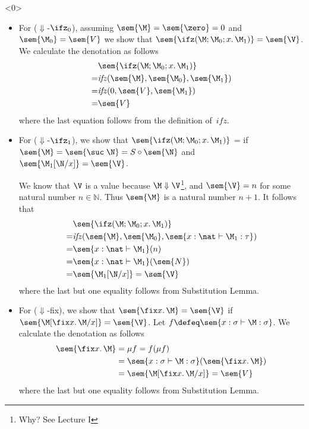 \begin{frame}<0>
\begin{itemize}
  \item For ($\Downarrow$-$\ifz_0$), assuming $\sem{\M}=\sem{\zero} = 0$
    and $\sem{\M_0} = \sem{V}$ we show that
    $\sem{\ifz(\M; \M_0; x.\, \M_1)} = \sem{\V}$. We calculate the
    denotation as follows
    \begin{align*}
      & \sem{\ifz(\M;\M_0;x.\,\M_1)} \\
         = &\mathit{ifz}(\sem{\M}, \sem{\M_0}, \sem{\M_1}) \\
         = &\mathit{ifz}(0, \sem{V}, \sem{\M_1}) \\
         = &\sem{V}
    \end{align*}
    where the last equation follows from the definition of~$\mathit{ifz}$. 
  \item For ($\Downarrow$-$\ifz_1$), we show that $\sem{\ifz(\M;\M_0;
      x.\,\M_1)}$ =  if $\sem{\M} = \sem{\suc\;\N} = S \circ \sem{\N}$
    and $\sem{\M_1[\N/x]} = \sem{\V}$.

  We know that $\V$ is a value because $\M\Downarrow\V$\footnote{
    Why? See Lecture I}, and $\sem{\V} = n$ for some natural number $n
  \in \mathbb{N}$.  Thus $\sem{\M}$ is a natural number $n + 1$. It follows
  that 
  \begin{align*}
       & \sem{\ifz(\M; \M_0; x.\,\M_1)} \\
     = & \mathit{ifz}(\sem{\M}, \sem{\M_0}, \sem{x : \nat\vdash \M_1 :
      \tau}) \\
     = & \sem{x : \nat \vdash \M_1}(n) \\
     = & \sem{x : \nat \vdash \M_1}(\sem{N}) \\
     = &\sem{\M_1[\N/x]} = \sem{\V}
  \end{align*}
  where the last but one equality follows from Substitution Lemma.

  \item For ($\Downarrow$-fix), we show that $\sem{\fix x.\,\M} = \sem{\V}$ if
    $\sem{\M[\fix x.\,\M/x]} = \sem{\V}$.  Let $f \defeq \sem{x : \sigma \vdash
      \M : \sigma}$.  We
    calculate the denotation as follows
    \begin{align*}
      \sem{\fix x.\,\M}
      & = \mu f = f(\mu f) \\
      & = \sem{x : \sigma \vdash \M : \sigma}(\sem{\fix x.\, \M}) \\
      & = \sem{\M[\fix x.\, \M/x]} = \sem{V}
    \end{align*}
    where the last but one equality follows from Substitution Lemma.
\end{itemize}
\end{frame}

